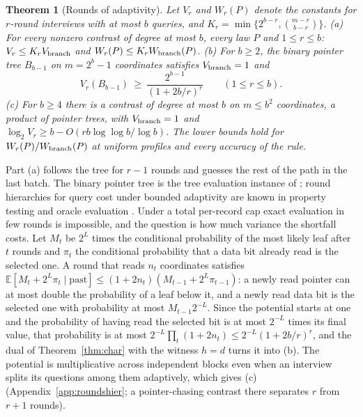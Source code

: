 \documentclass{article}
\newtheorem{theorem}{Theorem}
\newcommand{\E}{\mathbb{E}}
\begin{document}
\begin{theorem}[Rounds of adaptivity]\label{thm:rounds}
Let $V_r$ and $W_r(P)$ denote the constants for $r$-round interviews with at most $b$ queries, and $K_r=\min\{2^{b-r},\binom{m-r}{b-r}\}$.
\textup{(a)} For every nonzero contrast of degree at most $b$, every law $P$ and $1\le r\le b$: $V_r\le K_rV_{\rm branch}$ and $W_r(P)\le K_rW_{\rm branch}(P)$.
\textup{(b)} For $b\ge2$, the binary pointer tree $B_{b-1}$ on $m=2^b-1$ coordinates satisfies $V_{\rm branch}=1$ and
\[
 V_r(B_{b-1})\ \ge\ \frac{2^{b-1}}{(1+2b/r)^{r}}\qquad(1\le r\le b).
\]
\textup{(c)} For $b\ge4$ there is a contrast of degree at most $b$ on $m\le b^2$ coordinates, a product of pointer trees, with $V_{\rm branch}=1$ and $\log_2V_r\ge b-O(rb\log\log b/\log b)$.
The lower bounds hold for $W_r(P)/W_{\rm branch}(P)$ at uniform profiles and every accuracy of the rule.
\end{theorem}

Part (a) follows the tree for $r-1$ rounds and guesses the rest of the path in the last batch. The binary pointer tree is the tree evaluation instance of \citet{cook2012}; round hierarchies for query cost under bounded adaptivity are known in property testing and oracle evaluation \citep{canonne2018,li2026regex}. Under a total per-record cap exact evaluation in few rounds is impossible, and the question is how much variance the shortfall costs. Let $M_t$ be $2^{L}$ times the conditional probability of the most likely leaf after $t$ rounds and $\pi_t$ the conditional probability that a data bit already read is the selected one. A round that reads $n_t$ coordinates satisfies $\E[M_t+2^L\pi_t\mid\text{past}]\le(1+2n_t)(M_{t-1}+2^L\pi_{t-1})$: a newly read pointer can at most double the probability of a leaf below it, and a newly read data bit is the selected one with probability at most $M_{t-1}2^{-L}$. Since the potential starts at one and the probability of having read the selected bit is at most $2^{-L}$ times its final value, that probability is at most $2^{-L}\prod_t(1+2n_t)\le2^{-L}(1+2b/r)^r$, and the dual of Theorem~\ref{thm:char} with the witness $h=d$ turns it into (b). The potential is multiplicative across independent blocks even when an interview splits its questions among them adaptively, which gives (c) (Appendix~\ref{app:roundshier}; a pointer-chasing contrast there separates $r$ from $r+1$ rounds).
\end{document}
